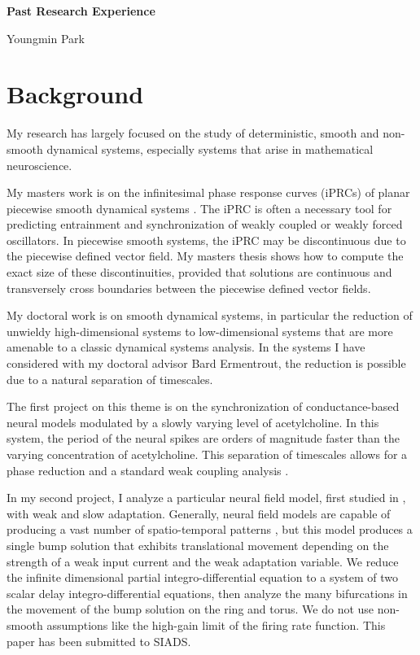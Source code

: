 \documentclass[a4paper,11pt]{article}
\begin{document}
\begin{center}
\Large \textbf{Past Research Experience}

\Large Youngmin Park
\end{center}

\section{Background}
My research has largely focused on the study of deterministic, smooth and non-smooth dynamical systems, especially systems that arise in mathematical neuroscience.

My masters work is on the infinitesimal phase response curves (iPRCs) of planar piecewise smooth dynamical systems \cite{park2013infinitesimal}. The iPRC is often a necessary tool for predicting entrainment and synchronization of weakly coupled or weakly forced oscillators. In piecewise smooth systems, the iPRC may be discontinuous due to the piecewise defined vector field. My masters thesis shows how to compute the exact size of these discontinuities, provided that solutions are continuous and transversely cross boundaries between the piecewise defined vector fields.

My doctoral work is on smooth dynamical systems, in particular the reduction of unwieldy high-dimensional systems to low-dimensional systems that are more amenable to a classic dynamical systems analysis. In the systems I have considered with my doctoral advisor Bard Ermentrout, the reduction is possible due to a natural separation of timescales.

The first project on this theme is on the synchronization of conductance-based neural models modulated by a slowly varying level of acetylcholine. In this system, the period of the neural spikes are orders of magnitude faster than the varying concentration of acetylcholine. This separation of timescales allows for a phase reduction and a standard weak coupling analysis \cite{park2016weakly}.

In my second project, I analyze a particular neural field model, first studied in \cite{pinto_ermentrout_2001_siam}, with weak and slow adaptation. Generally, neural field models are capable of producing a vast number of spatio-temporal patterns \cite{breakspear2017dynamic}, but this model produces a single bump solution that exhibits translational movement depending on the strength of a weak input current and the weak adaptation variable. We reduce the infinite dimensional partial integro-differential equation to a system of two scalar delay integro-differential equations, then analyze the many bifurcations in the movement of the bump solution on the ring and torus. We do not use non-smooth assumptions like the high-gain limit of the firing rate function. This paper has been submitted to SIADS.




\end{document}
